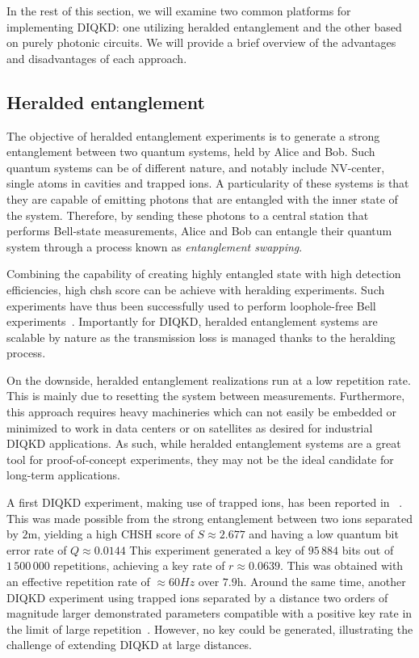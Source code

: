 \medbreak

In the rest of this section, we will examine two common platforms for implementing DIQKD: one utilizing heralded entanglement and the other based on purely photonic circuits. 
We will provide a brief overview of the advantages and disadvantages of each approach.

\subsection{Heralded entanglement}

The objective of heralded entanglement experiments is to generate a strong entanglement between two quantum systems, held by Alice and Bob.
Such quantum systems can be of different nature, and notably include NV-center, single atoms in cavities and trapped ions.
A particularity of these systems is that they are capable of emitting photons that are entangled with the inner state of the system.
Therefore, by sending these photons to a central station that performs Bell-state measurements, Alice and Bob can entangle their quantum system through a process known as \textit{entanglement swapping}.

Combining the capability of creating highly entangled state with high detection efficiencies, high \acrshort{chsh} score can be achieve with heralding experiments. 
Such experiments have thus been successfully used to perform loophole-free Bell experiments~\cite{Hensen2015,Rosenfeld2017}.
Importantly for DIQKD, heralded entanglement systems are scalable by nature as the transmission loss is managed thanks to the heralding process.

On the downside, heralded entanglement realizations run at a low repetition rate. 
This is mainly due to resetting the system between measurements.
Furthermore, this approach requires heavy machineries which can not easily be embedded or minimized to work in data centers or on satellites as desired for industrial DIQKD applications.
As such, while heralded entanglement systems are a great tool for proof-of-concept experiments, they may not be the ideal candidate for long-term applications.

\medbreak

A first DIQKD experiment, making use of trapped ions, has been reported in ~\cite{Nadlinger2022}.
This was made possible from the strong entanglement between two ions separated by $2\mathrm{m}$, yielding a high CHSH score of $S\approx 2.677$ and having a low quantum bit error rate of $Q\approx 0.0144$
This experiment generated a key of $95\,884$ bits out of $1\,500\,000$ repetitions, achieving a key rate of $r \approx 0.0639$. This was obtained with an effective repetition rate of $\approx 60Hz$ over $7.9$h. 
Around the same time, another DIQKD experiment using trapped ions separated by a distance two orders of magnitude larger demonstrated parameters compatible with a positive key rate in the limit of large repetition~\cite{Zhang2022}. 
However, no key could be generated, illustrating the challenge of extending DIQKD at large distances.

